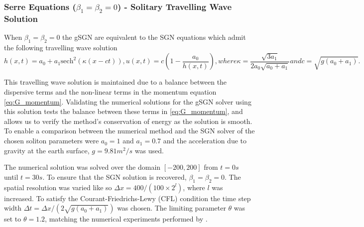 \documentclass[10pt]{elsarticle}
\begin{document}
\subsubsection{Serre Equations ($\beta_1=\beta_2 =0$) - Solitary Travelling Wave Solution}
When $\beta_1 = \beta_2 = 0$ the gSGN are equivalent to the SGN equations which admit the following travelling wave solution
\begin{subequations}
	\begin{equation}
	h(x,t) = a_0 + a_1 \text{sech}^2\left( \kappa (x - ct) \right),
	\end{equation}
	\begin{equation}
	u(x,t) = c \left( 1- \dfrac{a_0}{h(x,t)} \right),
	\end{equation}
	where
	\begin{equation}
	\kappa = \dfrac{\sqrt{3a_1}}{2a_0 \sqrt{a_0 + a_1}}
	\end{equation}
	and
	\begin{equation}
	c = \sqrt{g\left(a_0 + a_1\right)}.
	\end{equation}
\end{subequations}

This travelling wave solution is maintained due to a balance between the dispersive terms and the non-linear terms in the momentum equation \eqref{eq:G_momentum}. Validating the numerical solutions for the gSGN solver using this solution tests the balance between these terms in \eqref{eq:G_momentum}, and allows us to verify the method's conservation of energy as the solution is smooth. To enable a comparison between the numerical method and the SGN solver of \cite{Zoppou-etal-2017} the chosen soliton parameters were $a_0 = 1$ and $a_1 = 0.7$ and the acceleration due to gravity at the earth surface, $g = 9.81 m^2/s$ was used.

The numerical solution was solved over the domain $\left[-200,200\right]$ from $t=0s$ until $t=30s$. To ensure that the SGN solution is recovered, $\beta_1 = \beta_2=0$. The spatial resolution was varied like so $\Delta x = 400 / (100 \times 2^{l})$, where $l$ was increased. To satisfy the Courant-Friedrichs-Lewy (CFL) condition \cite{Lax-Richtmyer-1956-267} the time step width $\Delta t = \Delta x  / \left( 2 \sqrt{g \left(a_0 + a_1\right)}\right)$ \cite{Pitt-2019} was chosen. The limiting parameter $\theta$ was set to $\theta = 1.2$, matching the numerical experiments performed by \citet{Pitt-2019}.
\end{document}
